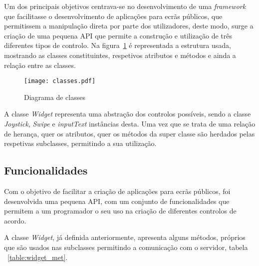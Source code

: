 Um dos principais objetivos centrava-se no desenvolvimento de uma \textit{framework} que facilitasse o desenvolvimento de aplicações para ecrãs públicos, que permitissem a manipulação direta por parte dos utilizadores, deste modo, surge a criação de uma pequena API que permite a construção e utilização de três diferentes tipos de controlo. 
Na figura~\ref{fig:classes} é representada a estrutura usada, mostrando as classes constituintes, respetivos atributos e métodos e ainda a relação entre as classes.

\begin{figure}[ht]
\centering
\texttt{[image: classes.pdf]}
\caption[\textit{classes}] {Diagrama de classes}
\label{fig:classes}
\end{figure}

A classe \textit{Widget} representa uma abstração dos controlos possíveis, sendo a classe \textit{Joystick}, \textit{Swipe} e \textit{inputText} instâncias desta. Uma vez que se trata de uma relação de herança, quer os atributos, quer os métodos da super classe são herdados pelas respetivas subclasses, permitindo a sua utilização.

\subsection{Funcionalidades}

	Com o objetivo de facilitar a criação de aplicações para ecrãs públicos, foi desenvolvida uma pequena API, com um conjunto de funcionalidades que permitem a um programador o seu uso na criação de diferentes controlos de acordo.

	A classe \textit{Widget}, já definida anteriormente, apresenta alguns métodos, próprios que são usados nas subclasses permitindo a comunicação com o servidor, tabela ~\ref{table:widget_met}.

